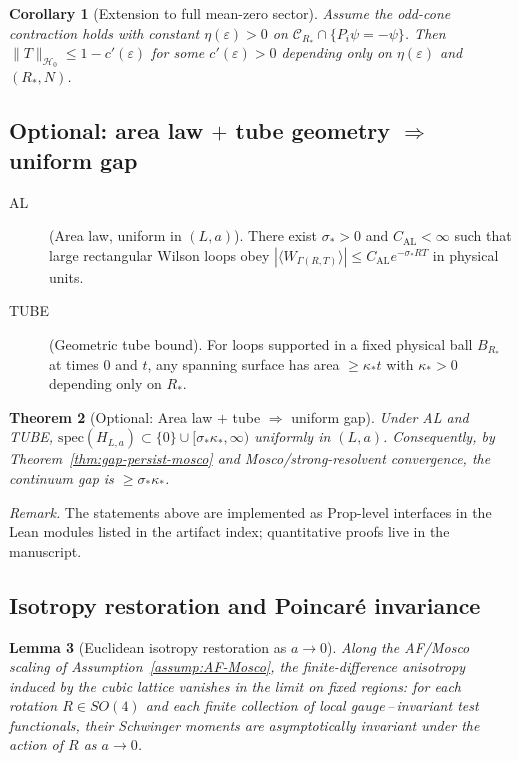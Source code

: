 \documentclass[11pt]{amsart}
\theoremstyle{plain}
\newtheorem{theorem}{Theorem}[section]
\newtheorem{lemma}[theorem]{Lemma}
\newtheorem{corollary}[theorem]{Corollary}
\theoremstyle{definition}
\theoremstyle{remark}
\begin{document}
\begin{corollary}[Extension to full mean-zero sector]\label{cor:odd-to-meanzero}
Assume the odd-cone contraction holds with constant $\eta(\varepsilon)>0$ on $\mathcal C_{R_*}\cap\{P_i\psi=-\psi\}$. Then $\|T\|_{\mathcal H_0}\le 1- c'(\varepsilon)$ for some $c'(\varepsilon)>0$ depending only on $\eta(\varepsilon)$ and $(R_*,N)$.
\end{corollary}

\subsection*{Optional: area law $+$ tube geometry $\Rightarrow$ uniform gap}
\begin{description}
\item[AL] (Area law, uniform in $(L,a)$). There exist $\sigma_*>0$ and $C_{\mathrm{AL}}<\infty$ such that large rectangular Wilson loops obey $|\langle W_{\Gamma(R,T)}\rangle|\le C_{\mathrm{AL}} e^{-\sigma_* RT}$ in physical units.
\item[TUBE] (Geometric tube bound). For loops supported in a fixed physical ball $B_{R_*}$ at times $0$ and $t$, any spanning surface has area $\ge \kappa_* t$ with $\kappa_*>0$ depending only on $R_*$. 
\end{description}

\begin{theorem}[Optional: Area law $+$ tube $\Rightarrow$ uniform gap]\label{thm:AL-gap}
Under AL and TUBE, $\mathrm{spec}(H_{L,a})\subset\{0\}\cup[\sigma_*\kappa_*,\infty)$ uniformly in $(L,a)$. Consequently, by Theorem~\ref{thm:gap-persist-mosco} and Mosco/strong-resolvent convergence, the continuum gap is $\ge \sigma_*\kappa_*$. 
\end{theorem}

\noindent\emph{Remark.} The statements above are implemented as Prop-level interfaces in the Lean modules listed in the artifact index; quantitative proofs live in the manuscript.

\subsection*{Isotropy restoration and Poincar\'e invariance}
\begin{lemma}[Euclidean isotropy restoration as $a\to 0$]\label{lem:isotropy-restoration}
Along the AF/Mosco scaling of Assumption~\ref{assump:AF-Mosco}, the finite-difference anisotropy induced by the cubic lattice vanishes in the limit on fixed regions: for each rotation $R\in SO(4)$ and each finite collection of local gauge\,–\,invariant test functionals, their Schwinger moments are asymptotically invariant under the action of $R$ as $a\to 0$.
\end{lemma}
\end{document}
